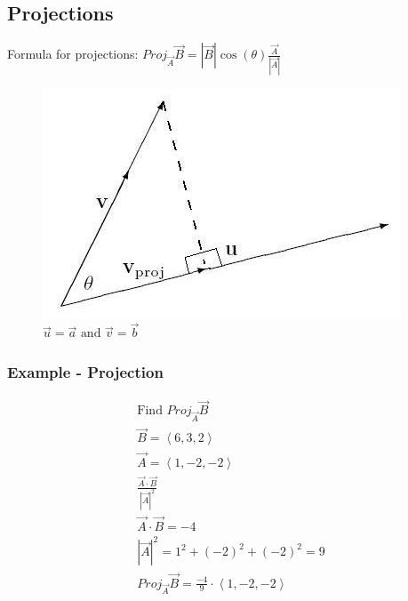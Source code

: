 \documentclass{article}
\newcommand{\nvec}[1]{\left\langle #1 \right\rangle}
\begin{document}
    \subsection{Projections}
    Formula for projections: $Proj_{\vec{A}}\vec{B}=|\vec{B}|\cos(\theta)\frac{\vec{A}}{|\vec{A}|}$
    \begin{figure}[ht]
        \centering
        \includegraphics[scale=.5]{projection.JPG}
        \caption{$\vec{u}=\vec{a} \text{ and } \vec{v}=\vec{b}$}
    \end{figure}

        \subsubsection{Example - Projection}
        \[
        \begin{aligned}
        \text{Find }Proj_{\vec{A}} \vec{B}\\
        \vec{B} = \nvec{6,3,2}\\
        \vec{A} = \nvec{1,-2,-2}\\
        \frac{\vec{A} \cdot \vec{B}}{{|\vec{A}|^2}}\\
        \vec{A} \cdot \vec{B} = -4\\
        |\vec{A}|^2 = 1^2 + (-2)^2 + (-2)^2 = 9\\
        Proj_{\vec{A}} \vec{B} = \frac{-4}{9} \cdot \nvec{1,-2,-2}\\
        \end{aligned}
        \]
\end{document}
